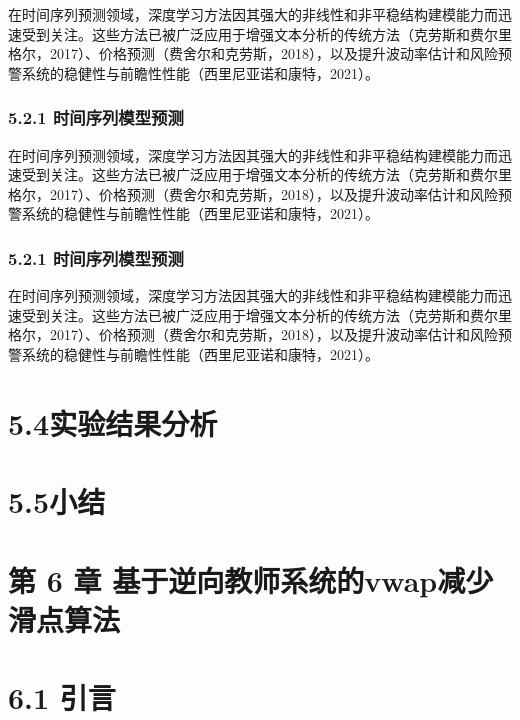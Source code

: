 \documentclass[UTF8]{ctexart}
\begin{document}
在时间序列预测领域，深度学习方法因其强大的非线性和非平稳结构建模能力而迅速受到关注。这些方法已被广泛应用于增强文本分析的传统方法（克劳斯和费尔里格尔，2017）、价格预测（费舍尔和克劳斯，2018），以及提升波动率估计和风险预警系统的稳健性与前瞻性性能（西里尼亚诺和康特，2021）。

\subsubsection{5.2.1
时间序列模型预测}\label{ux65f6ux95f4ux5e8fux5217ux6a21ux578bux9884ux6d4b-3}

在时间序列预测领域，深度学习方法因其强大的非线性和非平稳结构建模能力而迅速受到关注。这些方法已被广泛应用于增强文本分析的传统方法（克劳斯和费尔里格尔，2017）、价格预测（费舍尔和克劳斯，2018），以及提升波动率估计和风险预警系统的稳健性与前瞻性性能（西里尼亚诺和康特，2021）。

\subsubsection{5.2.1
时间序列模型预测}\label{ux65f6ux95f4ux5e8fux5217ux6a21ux578bux9884ux6d4b-4}

在时间序列预测领域，深度学习方法因其强大的非线性和非平稳结构建模能力而迅速受到关注。这些方法已被广泛应用于增强文本分析的传统方法（克劳斯和费尔里格尔，2017）、价格预测（费舍尔和克劳斯，2018），以及提升波动率估计和风险预警系统的稳健性与前瞻性性能（西里尼亚诺和康特，2021）。

\section{5.4实验结果分析}\label{ux5b9eux9a8cux7ed3ux679cux5206ux6790-1}

\section{5.5小结}\label{ux5c0fux7ed3-2}

\section{第 6 章
基于逆向教师系统的vwap减少滑点算法}\label{ux7b2c-6-ux7ae0-ux57faux4e8eux9006ux5411ux6559ux5e08ux7cfbux7edfux7684vwapux51cfux5c11ux6ed1ux70b9ux7b97ux6cd5}

\section{6.1 引言}\label{ux5f15ux8a00-3}
\end{document}
